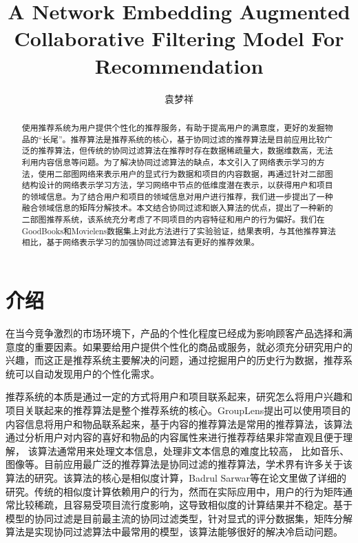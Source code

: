 \documentclass[lang=cn,11pt]{elegantpaper}
\title{A Network Embedding Augmented Collaborative Filtering Model For Recommendation}
\author{袁梦祥}
\institute{安徽大学大数据与云服务工程实验室}
\date{}
\begin{document}
\maketitle

\begin{abstract}
\noindent 使用推荐系统为用户提供个性化的推荐服务，有助于提高用户的满意度，更好的发掘物品的“长尾”。推荐算法是推荐系统的核心，基于协同过滤的推荐算法是目前应用比较广泛的推荐算法，但传统的协同过滤算法在推荐时存在数据稀疏量大，数据维数高，无法利用内容信息等问题。为了解决协同过滤算法的缺点，本文引入了网络表示学习的方法，使用二部图网络来表示用户的显式行为数据和项目的内容数据，再通过针对二部图结构设计的网络表示学习方法，学习网络中节点的低维度潜在表示，以获得用户和项目的领域信息。为了结合用户和项目的领域信息对用户进行推荐，我们进一步提出了一种融合领域信息的矩阵分解技术。本文结合协同过滤和嵌入算法的优点，提出了一种新的二部图推荐系统，该系统充分考虑了不同项目的内容特征和用户的行为偏好。我们在GoodBooks和Movielens数据集上对此方法进行了实验验证，结果表明，与其他推荐算法相比，基于网络表示学习的加强协同过滤算法有更好的推荐效果。
\end{abstract}


\section{介绍}

在当今竞争激烈的市场环境下，产品的个性化程度已经成为影响顾客产品选择和满意度的重要因素。如果要给用户提供个性化的商品或服务，就必须充分研究用户的兴趣，而这正是推荐系统主要解决的问题，通过挖掘用户的历史行为数据，推荐系统可以自动发现用户的个性化需求。

推荐系统的本质是通过一定的方式将用户和项目联系起来，研究怎么将用户兴趣和项目关联起来的推荐算法是整个推荐系统的核心。GroupLens\cite{Vig2008}提出可以使用项目的内容信息将用户和物品联系起来，基于内容的推荐算法\cite{Balabanovic1997,Jannach2013,Meteren2000}是常用的推荐算法，该算法通过分析用户对内容的喜好和物品的内容属性来进行推荐荐结果非常直观且便于理解， 该算法通常用来处理文本信息\cite{Bhagavatula2018}，处理非文本信息的难度比较高， 比如音乐、图像等。目前应用最广泛的推荐算法是协同过滤的推荐算法，学术界有许多关于该算法的研究\cite{Linden2003,Miranda2009,Sarwar2001a,Su2009}。该算法的核心是相似度计算，Badrul Sarwar等在论文里做了详细的研究\cite{Sarwar2001}。传统的相似度计算依赖用户的行为，然而在实际应用中，用户的行为矩阵通常比较稀疏，且容易受项目流行度影响，这导致相似度的计算结果并不稳定。基于模型的协同过滤是目前最主流的协同过滤类型，针对显式的评分数据集，矩阵分解算法\cite{Salakhutdinov2007,Koren2009,Koren2008}是实现协同过滤算法中最常用的模型，该算法能够很好的解决冷启动问题\cite{Qiu2011}。
\end{document}

